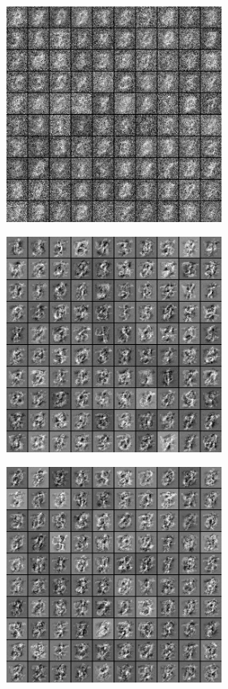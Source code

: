 \documentclass[a4paper]{scrartcl}
\begin{document}
\begin{minipage}[t]{0.5\textwidth}
\begin{center}
	\includegraphics[width=7cm]{images/filtry_10epoch_50train.png}
	\vspace{-1em}
	\end{center}
\end{minipage}
\begin{minipage}[t]{0.5\textwidth}
	\begin{center}
	\includegraphics[width=7cm]{images/filtry_100epoch_50train.png}
	\vspace{-1em}
	\end{center}
\end{minipage}
\begin{minipage}[t]{0.5\textwidth}
\begin{center}
\includegraphics[width=7cm]{images/filters_epoch500_train50.png}
\vspace{-1em}
\end{center}
\end{minipage}
\end{document}
